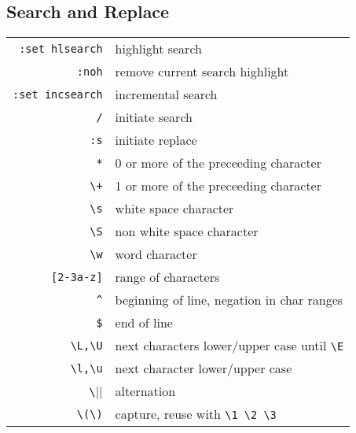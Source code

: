\begin{multicols*}{3}
\section*{Search and Replace}
\begin{tabular}{@{}rl@{}}
\verb|:set hlsearch| & highlight search \\
\verb|:noh|      & remove current search highlight \\
\verb|:set incsearch| & incremental search \\
\verb|/|        & initiate search \\
\verb|:s|       & initiate replace \\
\verb|*|        & 0 or more of the preceeding character \\
\verb|\+|       & 1 or more of the preceeding character \\
\verb|\s|       & white space character \\
\verb|\S|       & non white space character \\
\verb|\w|       & word character \\
\verb|[2-3a-z]| & range of characters \\
\verb|^|        & beginning of line, negation in char ranges \\
\verb|$|        & end of line \\
\verb|\L,\U|    & next characters lower/upper case until \verb|\E| \\
\verb|\l,\u|    & next character lower/upper case \\
\verb|\||       & alternation \\
\verb|\(\)|     & capture, reuse with \verb|\1 \2 \3|
\end{tabular}

\end{multicols*}


